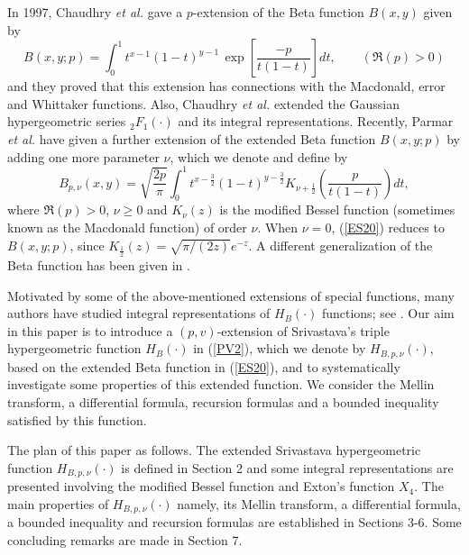 In 1997, Chaudhry {\it et al.} \cite[Eq.(1.7)]{AB8} gave a $p$-extension of the Beta function $B(x, y)$ given by \[B(x,y; p)= \int_0^1 t^{x-1}(1-t)^{y-1}\,\exp \left[\frac{-p}{t(1-t)}\right]dt,\qquad (\Re (p)>0)\]
and they proved that this extension has connections with the Macdonald, error and Whittaker functions. Also,  Chaudhry {\it et al.} \cite{AB10} extended the Gaussian hypergeometric series ${}_{2}F_{1}(\cdot)$ and its integral representations. 
Recently, Parmar {\it et al.} \cite{AB30} have given a further extension of the extended Beta function $B(x,y;p)$ by adding one more parameter $\nu$, which we denote and define by
\begin{equation}\label{ES20}
 B_{p,\nu}(x,y)=\sqrt{\frac{2p}{\pi}}\displaystyle{\int_{0}^{1}t^{x-\frac{3}{2}}(1-t)^{y-\frac{3}{2}}}
 K_{\nu+\frac{1}{2}}\left(\frac{p}{t(1-t)}\right)dt,
 \end{equation}
where $\Re(p)>0$, $\nu\geq0$ and $K_{\nu}(z)$ is the modified Bessel function (sometimes known as the Macdonald function) of order $\nu$. When $\nu=0$, (\ref{ES20}) reduces to $B(x,y;p)$, since $K_\frac{1}{2}(z)=\sqrt{\pi/(2z)} e^{-z}$. A different generalization of the Beta function has been given in \cite{AB28}. 

Motivated by some of the above-mentioned extensions of special functions,  many authors
have studied integral representations of $H_{B}(\cdot)$ functions; see  \cite{AB11, AB12, AB13, AB14}.  Our aim in this paper is to introduce a $(p,v)$-extension of Srivastava's triple hypergeometric function $H_{B}(\cdot)$ in (\ref{PV2}), which we denote by $H_{B,p,\nu}(\cdot)$, based on the extended Beta function in (\ref{ES20}), and to systematically investigate some properties of this extended function.  We consider the Mellin transform, a differential formula, recursion formulas and a bounded inequality satisfied by this function.

The plan of this paper as follows. The extended Srivastava hypergeometric function $H_{B,p,\nu}(\cdot)$ is  defined in Section 2 and some integral representations are presented involving the modified Bessel function and Exton's function $X_4$. The main properties of $H_{B,p,\nu}(\cdot)$ namely, its Mellin transform, a differential formula, a bounded inequality and recursion formulas are established in Sections 3-6. Some concluding remarks are made in Section 7.
\vspace{0.6cm}

